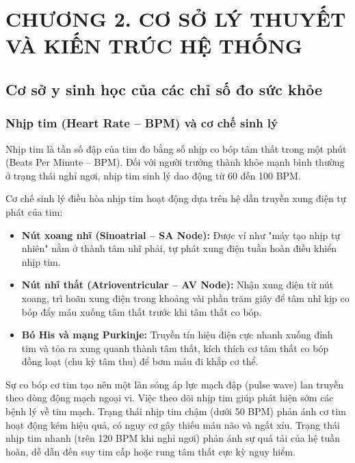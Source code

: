 \section*{CHƯƠNG 2. CƠ SỞ LÝ THUYẾT VÀ KIẾN TRÚC HỆ THỐNG}
\setcounter{section}{2}
\setcounter{subsection}{0}
\setcounter{figure}{0}
\setcounter{table}{0}

\subsection{Cơ sở y sinh học của các chỉ số đo sức khỏe}

\subsubsection{Nhịp tim (Heart Rate -- BPM) và cơ chế sinh lý}
Nhịp tim là tần số đập của tim đo bằng số nhịp co bóp tâm thất trong một phút (Beats Per Minute -- BPM). Đối với người trưởng thành khỏe mạnh bình thường ở trạng thái nghỉ ngơi, nhịp tim sinh lý dao động từ 60 đến 100 BPM. 

Cơ chế sinh lý điều hòa nhịp tim hoạt động dựa trên hệ dẫn truyền xung điện tự phát của tim:
\begin{itemize}
    \item \textbf{Nút xoang nhĩ (Sinoatrial -- SA Node):} Được ví như "máy tạo nhịp tự nhiên" nằm ở thành tâm nhĩ phải, tự phát xung điện tuần hoàn điều khiển nhịp tim.
    \item \textbf{Nút nhĩ thất (Atrioventricular -- AV Node):} Nhận xung điện từ nút xoang, trì hoãn xung điện trong khoảng vài phần trăm giây để tâm nhĩ kịp co bóp đẩy máu xuống tâm thất trước khi tâm thất co bóp.
    \item \textbf{Bó His và mạng Purkinje:} Truyền tín hiệu điện cực nhanh xuống đỉnh tim và tỏa ra xung quanh thành tâm thất, kích thích cơ tâm thất co bóp đồng loạt (chu kỳ tâm thu) để bơm máu đi khắp cơ thể.
\end{itemize}

Sự co bóp cơ tim tạo nên một làn sóng áp lực mạch đập (pulse wave) lan truyền theo dòng động mạch ngoại vi. Việc theo dõi nhịp tim giúp phát hiện sớm các bệnh lý về tim mạch. Trạng thái nhịp tim chậm (dưới 50 BPM) phản ánh cơ tim hoạt động kém hiệu quả, có nguy cơ gây thiếu máu não và ngất xỉu. Trạng thái nhịp tim nhanh (trên 120 BPM khi nghỉ ngơi) phản ánh sự quá tải của hệ tuần hoàn, dễ dẫn đến suy tim cấp hoặc rung tâm thất cực kỳ nguy hiểm.

